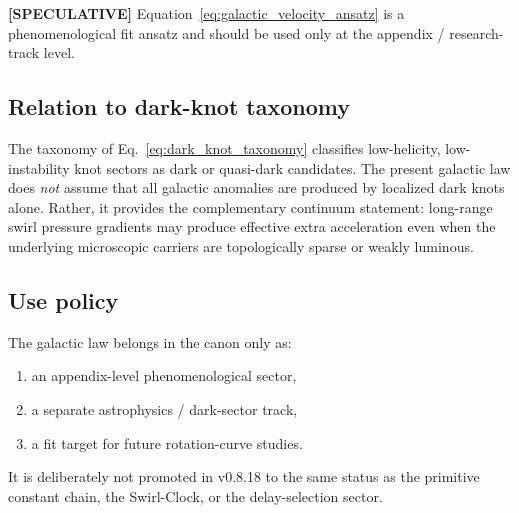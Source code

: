 \documentclass[11pt]{article}
\theoremstyle{definition}
\theoremstyle{plain}
\theoremstyle{remark}
\begin{document}
        \textbf{[SPECULATIVE]} Equation~\eqref{eq:galactic_velocity_ansatz} is a phenomenological fit ansatz and should be used only at the appendix / research-track level.
    
    \subsection{Relation to dark-knot taxonomy}
        The taxonomy of Eq.~\eqref{eq:dark_knot_taxonomy} classifies low-helicity, low-instability knot sectors as dark or quasi-dark candidates. The present galactic law does \emph{not} assume that all galactic anomalies are produced by localized dark knots alone. Rather, it provides the complementary continuum statement: long-range swirl pressure gradients may produce effective extra acceleration even when the underlying microscopic carriers are topologically sparse or weakly luminous.
    
    \subsection{Use policy}
        The galactic law belongs in the canon only as:
        \begin{enumerate}
            \item an appendix-level phenomenological sector,
            \item a separate astrophysics / dark-sector track,
            \item a fit target for future rotation-curve studies.
        \end{enumerate}
        It is deliberately not promoted in v0.8.18 to the same status as the primitive constant chain, the Swirl-Clock, or the delay-selection sector.
        
        \newpage
        \newif\ifresearchtrackincluded
        \researchtrackincludedtrue
        
        
\end{document}
